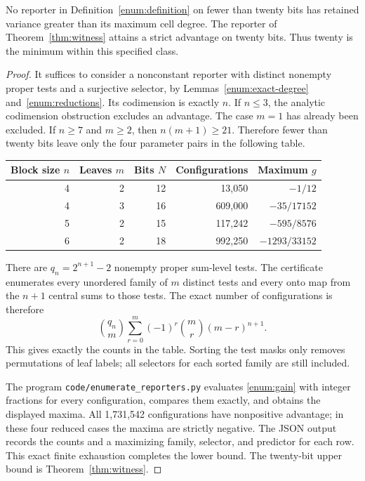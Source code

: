 \begin{theorem}
\label{enum:minimality}
No reporter in Definition~\ref{enum:definition} on fewer than twenty
bits has retained variance greater than its maximum cell degree.
The reporter of Theorem~\ref{thm:witness} attains a strict advantage
on twenty bits. Thus twenty is the minimum within this specified
class.
\end{theorem}

\begin{proof}
It suffices to consider a nonconstant reporter with distinct nonempty
proper tests and a surjective selector, by
Lemmas~\ref{enum:exact-degree} and~\ref{enum:reductions}.
Its codimension is exactly \(n\). If \(n\le3\), the analytic
codimension obstruction excludes an advantage. The case \(m=1\)
has already been excluded. If \(n\ge7\) and \(m\ge2\), then
\(n(m+1)\ge21\). Therefore fewer than twenty bits leave only the
four parameter pairs in the following table.

\begin{center}
\begin{tabular}{@{}rrrrr@{}}
\toprule
Block size \(n\)&Leaves \(m\)&Bits \(N\)&Configurations&Maximum \(g\)\\
\midrule
4&2&12&13,050&\(-1/12\)\\
4&3&16&609,000&\(-35/17152\)\\
5&2&15&117,242&\(-595/8576\)\\
6&2&18&992,250&\(-1293/33152\)\\
\bottomrule
\end{tabular}
\end{center}

There are \(q_n=2^{n+1}-2\) nonempty proper sum-level tests. The
certificate enumerates every unordered family of \(m\) distinct
tests and every onto map from the \(n+1\) central sums to those
tests. The exact number of configurations is therefore
\begin{equation}\label{enum:count}
 \binom{q_n}{m}
 \sum_{r=0}^m(-1)^r\binom mr(m-r)^{n+1}.
\end{equation}
This gives exactly the counts in the table. Sorting the test masks
only removes permutations of leaf labels; all selectors for each
sorted family are still included.

The program \texttt{code/enumerate\_reporters.py} evaluates
\eqref{enum:gain} with integer fractions for every configuration,
compares them exactly, and obtains the displayed maxima. All
1,731,542 configurations have nonpositive advantage; in these four
reduced cases the maxima are strictly negative. The JSON output
records the counts and a maximizing family, selector, and predictor
for each row. This exact finite exhaustion completes the lower
bound. The twenty-bit upper bound is
Theorem~\ref{thm:witness}.
\end{proof}

